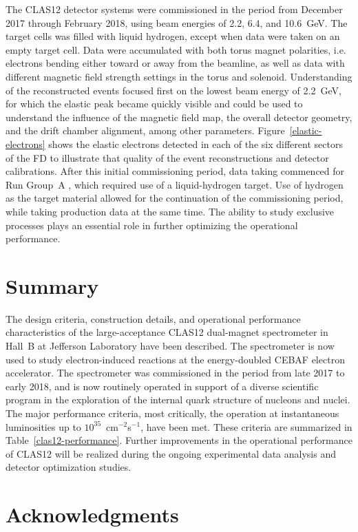 \documentclass[final,3p]{elsarticle}
\begin{document}
\begin{twocolumn}
The CLAS12 detector systems were commissioned in the period from December 2017 through February 2018, using
beam energies of 2.2, 6.4, and 10.6~GeV. The target cells was filled with liquid hydrogen, except when data were taken
on an empty target cell. Data were accumulated with both torus magnet polarities, i.e. electrons bending either toward
or away from the beamline, as well as data with different magnetic field strength settings in the torus and solenoid.
Understanding of the reconstructed events focused first on the lowest beam energy of 2.2~GeV, for which the elastic
peak became quickly visible and could be used to understand the influence of the magnetic field map, the overall detector
geometry, and the drift chamber alignment, among other parameters. Figure~\ref{elastic-electrons} shows the elastic
electrons detected in each of the six different sectors of the FD to illustrate that quality of the event reconstructions
and detector calibrations. After this initial commissioning period, data taking commenced for Run Group~A
\cite{rg-details}, which required use of a liquid-hydrogen target. Use of hydrogen as the target material allowed for
the continuation of the commissioning period, while taking production data at the same time. The ability to study
exclusive processes plays an essential role in further optimizing the operational performance. 

\section{Summary} 

The design criteria, construction details, and operational performance characteristics of the large-acceptance
CLAS12 dual-magnet spectrometer in Hall~B at Jefferson Laboratory have been described. The spectrometer is
now used to study electron-induced reactions at the energy-doubled CEBAF electron accelerator. The spectrometer
was commissioned in the period from late 2017 to early 2018, and is now routinely operated in support of a diverse
scientific program in the exploration of the internal quark structure of nucleons and nuclei. The major performance
criteria, most critically, the operation at  instantaneous luminosities up to $10^{35}$~cm$^{-2}$s$^{-1}$, have been met.
These criteria are summarized in Table~\ref{clas12-performance}. Further improvements in the operational
performance of CLAS12 will be realized during the ongoing experimental data analysis and detector optimization
studies.

\section*{Acknowledgments}


\end{twocolumn}
\end{document}
